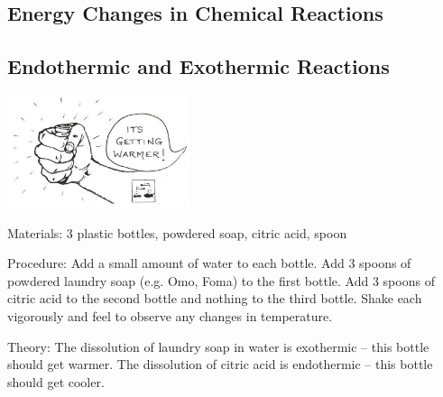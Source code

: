 \begin{multicols}{2}
\section*{Energy Changes in Chemical Reactions}


\subsection{Endothermic and Exothermic Reactions} %

\begin{center}
\includegraphics[width=0.4\textwidth]{./img/source/exothermic.jpg}
\end{center}

\begin{description*}
\item[Materials:]{3 plastic bottles, powdered soap, citric acid, spoon}
\item[Procedure:]{Add a small amount of water to each bottle. Add 3 spoons of powdered laundry soap (e.g. Omo, Foma) to the first bottle. Add 3 spoons of citric acid to the second bottle and nothing to the third bottle. Shake each vigorously and feel to observe any changes in temperature.}
\item[Theory:]{The dissolution of laundry soap in water is exothermic -- this bottle should
get warmer. The dissolution of citric acid is endothermic -- this bottle should get cooler.}
\end{description*}


\end{multicols}
